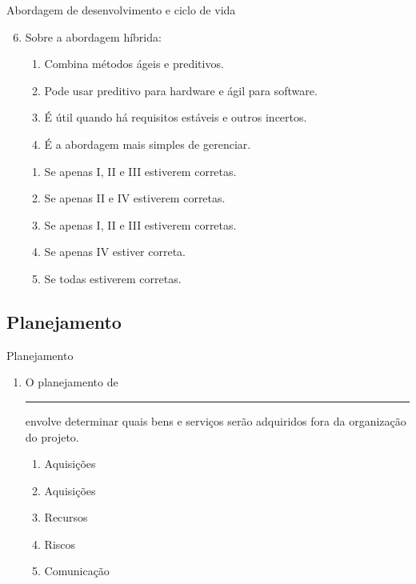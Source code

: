 \documentclass{beamer}
\begin{document}
\begin{frame}{Abordagem de desenvolvimento e ciclo de vida}
	\begin{enumerate}
		\setcounter{enumi}{5}
		\justifying
		\item Sobre a abordagem híbrida:
		\begin{enumerate}[I]
			\item Combina métodos ágeis e preditivos.
			\item Pode usar preditivo para hardware e ágil para software.
			\item É útil quando há requisitos estáveis e outros incertos.
			\item É a abordagem mais simples de gerenciar.
		\end{enumerate}
		\begin{enumerate}[a]
			\item Se apenas I, II e III estiverem corretas.
			\item Se apenas II e IV estiverem corretas.
			\item \alert<2>{Se apenas I, II e III estiverem corretas.}
			\item Se apenas IV estiver correta.
			\item Se todas estiverem corretas.
		\end{enumerate}
	\end{enumerate}
\end{frame}

\subsection{Planejamento}

\begin{frame}{Planejamento}
	\begin{enumerate}
		\justifying
		\item O planejamento de \rule{60pt}{1pt} envolve determinar quais bens e serviços serão adquiridos fora da organização do projeto.
		\begin{enumerate}[a]
			\item Aquisições
			\item \alert<2>{Aquisições}
			\item Recursos
			\item Riscos
			\item Comunicação
		\end{enumerate}
	\end{enumerate}
\end{frame}
\end{document}
